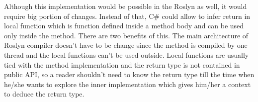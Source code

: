\par
Although this implementation would be possible in the Roslyn as well, it would require big portion of changes.
Instead of that, C\# could allow to infer return in local function which is function defined inside a method body and can be used only inside the method.
There are two benefits of this.
The main architecture of Roslyn compiler doesn't have to be change since the method is compiled by one thread and the local functions can't be used outside.
Local functions are usually tied with the method implementation and the return type is not contained in public API, so a reader shouldn't need to know the return type till the time when he/she wants to explore the inner implementation which gives him/her a context to deduce the return type.



